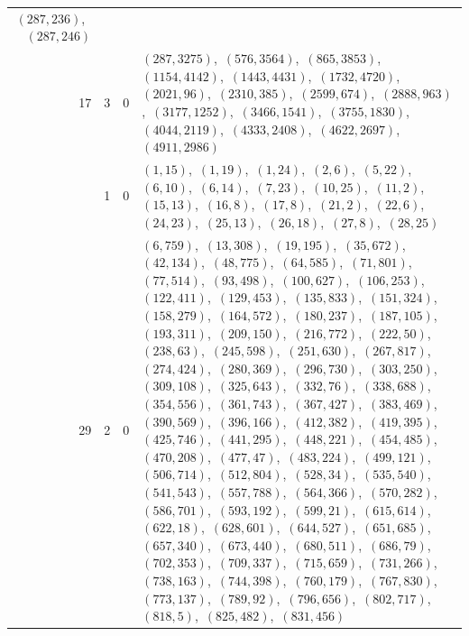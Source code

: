 \documentclass[11pt]{article}
\begin{document}
\begin{longtable}{@{}rrl>{\raggedright\arraybackslash}p{}@{}}
$(287,236)$,\allowbreak\ $(287,246)$\\
17 & 3 & $0$ & $(287,3275)$,\allowbreak\ $(576,3564)$,\allowbreak\ $(865,3853)$,\allowbreak\ $(1154,4142)$,\allowbreak\ $(1443,4431)$,\allowbreak\ $(1732,4720)$,\allowbreak\ $(2021,96)$,\allowbreak\ $(2310,385)$,\allowbreak\ $(2599,674)$,\allowbreak\ $(2888,963)$,\allowbreak\ $(3177,1252)$,\allowbreak\ $(3466,1541)$,\allowbreak\ $(3755,1830)$,\allowbreak\ $(4044,2119)$,\allowbreak\ $(4333,2408)$,\allowbreak\ $(4622,2697)$,\allowbreak\ $(4911,2986)$\\
\addlinespace[3pt]
29 & 1 & $0$ & $(1,15)$,\allowbreak\ $(1,19)$,\allowbreak\ $(1,24)$,\allowbreak\ $(2,6)$,\allowbreak\ $(5,22)$,\allowbreak\ $(6,10)$,\allowbreak\ $(6,14)$,\allowbreak\ $(7,23)$,\allowbreak\ $(10,25)$,\allowbreak\ $(11,2)$,\allowbreak\ $(15,13)$,\allowbreak\ $(16,8)$,\allowbreak\ $(17,8)$,\allowbreak\ $(21,2)$,\allowbreak\ $(22,6)$,\allowbreak\ $(24,23)$,\allowbreak\ $(25,13)$,\allowbreak\ $(26,18)$,\allowbreak\ $(27,8)$,\allowbreak\ $(28,25)$\\
29 & 2 & $0$ & $(6,759)$,\allowbreak\ $(13,308)$,\allowbreak\ $(19,195)$,\allowbreak\ $(35,672)$,\allowbreak\ $(42,134)$,\allowbreak\ $(48,775)$,\allowbreak\ $(64,585)$,\allowbreak\ $(71,801)$,\allowbreak\ $(77,514)$,\allowbreak\ $(93,498)$,\allowbreak\ $(100,627)$,\allowbreak\ $(106,253)$,\allowbreak\ $(122,411)$,\allowbreak\ $(129,453)$,\allowbreak\ $(135,833)$,\allowbreak\ $(151,324)$,\allowbreak\ $(158,279)$,\allowbreak\ $(164,572)$,\allowbreak\ $(180,237)$,\allowbreak\ $(187,105)$,\allowbreak\ $(193,311)$,\allowbreak\ $(209,150)$,\allowbreak\ $(216,772)$,\allowbreak\ $(222,50)$,\allowbreak\ $(238,63)$,\allowbreak\ $(245,598)$,\allowbreak\ $(251,630)$,\allowbreak\ $(267,817)$,\allowbreak\ $(274,424)$,\allowbreak\ $(280,369)$,\allowbreak\ $(296,730)$,\allowbreak\ $(303,250)$,\allowbreak\ $(309,108)$,\allowbreak\ $(325,643)$,\allowbreak\ $(332,76)$,\allowbreak\ $(338,688)$,\allowbreak\ $(354,556)$,\allowbreak\ $(361,743)$,\allowbreak\ $(367,427)$,\allowbreak\ $(383,469)$,\allowbreak\ $(390,569)$,\allowbreak\ $(396,166)$,\allowbreak\ $(412,382)$,\allowbreak\ $(419,395)$,\allowbreak\ $(425,746)$,\allowbreak\ $(441,295)$,\allowbreak\ $(448,221)$,\allowbreak\ $(454,485)$,\allowbreak\ $(470,208)$,\allowbreak\ $(477,47)$,\allowbreak\ $(483,224)$,\allowbreak\ $(499,121)$,\allowbreak\ $(506,714)$,\allowbreak\ $(512,804)$,\allowbreak\ $(528,34)$,\allowbreak\ $(535,540)$,\allowbreak\ $(541,543)$,\allowbreak\ $(557,788)$,\allowbreak\ $(564,366)$,\allowbreak\ $(570,282)$,\allowbreak\ $(586,701)$,\allowbreak\ $(593,192)$,\allowbreak\ $(599,21)$,\allowbreak\ $(615,614)$,\allowbreak\ $(622,18)$,\allowbreak\ $(628,601)$,\allowbreak\ $(644,527)$,\allowbreak\ $(651,685)$,\allowbreak\ $(657,340)$,\allowbreak\ $(673,440)$,\allowbreak\ $(680,511)$,\allowbreak\ $(686,79)$,\allowbreak\ $(702,353)$,\allowbreak\ $(709,337)$,\allowbreak\ $(715,659)$,\allowbreak\ $(731,266)$,\allowbreak\ $(738,163)$,\allowbreak\ $(744,398)$,\allowbreak\ $(760,179)$,\allowbreak\ $(767,830)$,\allowbreak\ $(773,137)$,\allowbreak\ $(789,92)$,\allowbreak\ $(796,656)$,\allowbreak\ $(802,717)$,\allowbreak\ $(818,5)$,\allowbreak\ $(825,482)$,\allowbreak\ $(831,456)$\\

\end{longtable}
\end{document}
